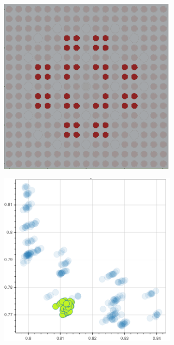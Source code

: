 \begin{figure}[h!]
\begin{subfigure}{0.45\textwidth}
  \caption{}
  \label{fig:chap10-capt-mean-spect-ind-mgxs}
\end{subfigure}
\begin{subfigure}{0.45\textwidth}
  \centering
  \includegraphics[width=0.9\linewidth]{figures/unsupervised/features/assm-16/u238-capt/mean-spect-ind-sum/geometry-2}
  \caption{}
  \label{fig:chap10-capt-mean-spect-ind-geom-2}
\end{subfigure}%
\begin{subfigure}{0.45\textwidth}
  \centering
  \includegraphics[width=0.9\linewidth]{figures/unsupervised/features/assm-16/u238-capt/mean-spect-ind-sum/mgxs-2}

\end{subfigure}
\end{figure}
